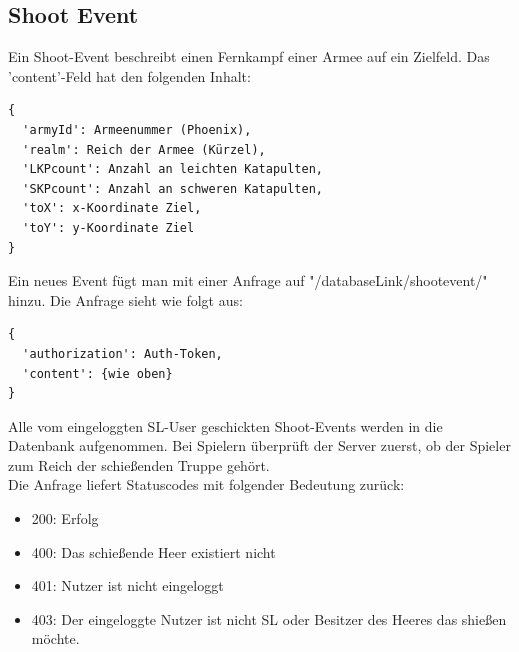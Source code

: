\documentclass[11pt,a4paper,twocolumn]{article}
\begin{document}
\subsection{Shoot Event}\label{ss:events_shoot}
Ein Shoot-Event beschreibt einen Fernkampf einer Armee auf ein Zielfeld. Das 'content'-Feld hat den folgenden Inhalt:
\begin{lstlisting}
{
  'armyId': Armeenummer (Phoenix),
  'realm': Reich der Armee (Kürzel),
  'LKPcount': Anzahl an leichten Katapulten,
  'SKPcount': Anzahl an schweren Katapulten,
  'toX': x-Koordinate Ziel,
  'toY': y-Koordinate Ziel
}
\end{lstlisting}
Ein neues Event fügt man mit einer Anfrage auf "/databaseLink/shootevent/" hinzu.  Die Anfrage sieht wie folgt aus:
\begin{lstlisting}
{
  'authorization': Auth-Token,
  'content': {wie oben}
}
\end{lstlisting}
Alle vom eingeloggten SL-User geschickten Shoot-Events werden in die Datenbank aufgenommen. Bei Spielern überprüft der Server zuerst, ob der Spieler zum Reich der schießenden Truppe gehört.\\
Die Anfrage liefert Statuscodes mit folgender Bedeutung zurück:
\begin{itemize}
\item 200: Erfolg
\item 400: Das schießende Heer existiert nicht
\item 401: Nutzer ist nicht eingeloggt
\item 403: Der eingeloggte Nutzer ist nicht SL oder Besitzer des Heeres das shießen möchte. 
\end{itemize}
\end{document}
